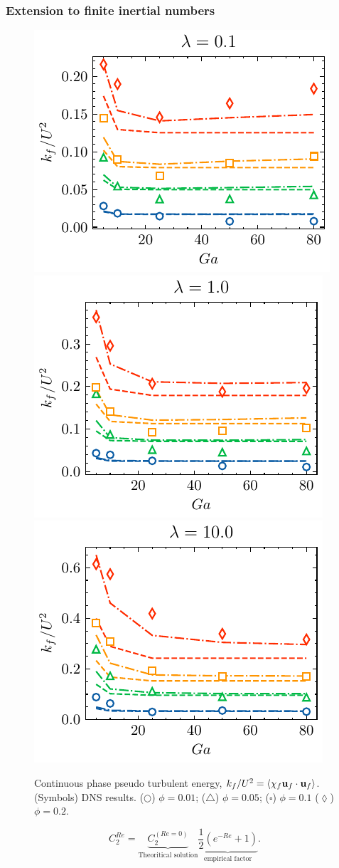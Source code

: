 \documentclass{sintefbeamer}
\begin{document}
\begin{frame}
  \frametitle{Extension to finite inertial numbers}
  \begin{figure}
    \centering
    \includegraphics[height = 0.25\textwidth]{image/HOMOGENEOUS_final/CA/KF2_l_0.pdf}
    \includegraphics[height = 0.25\textwidth]{image/HOMOGENEOUS_final/CA/KF2_l_1.pdf}
    \includegraphics[height = 0.25\textwidth]{image/HOMOGENEOUS_final/CA/KF2_l_10.pdf}
    \caption{\footnotesize
      Continuous phase pseudo turbulent energy, $k_f/U^2 = \left<\chi_f \textbf{u}_f \cdot \textbf{u}_f\right>$. 
    (Symbols) DNS results. 
    ($\pmb\bigcirc$) $\phi = 0.01$; ($\pmb\triangle$) $ \phi = 0.05$; ($\pmb\square$) $\phi = 0.1$ ($\pmb\lozenge$) $\phi = 0.2$.
    }
    \label{fig:kf}
\end{figure}
\begin{equation}
  C_2^{Re}
  = 
  \underbrace{ C_2^{(Re=0)}}_\text{Theoritical solution}
  \underbrace{\frac{1}{2}\left(e^{-Re} +1\right)}_{\text{empirical factor}}.
  \label{eq:semi_empirical}
\end{equation}

\end{frame}
\end{document}
